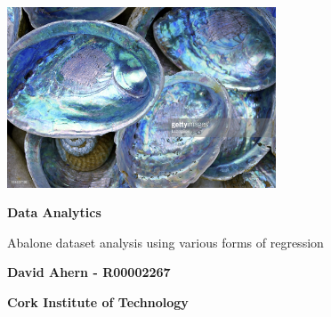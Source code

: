 \begin{titlepage}
    \begin{center}
    	\includegraphics[width=0.6\textwidth]{images/abalone.jpg}
    	
        \vspace*{1cm}
        
        \textbf{Data Analytics}
        
        \vspace{0.5cm}
      	Abalone dataset analysis using various forms of regression
        
        \vspace{1.5cm}
        
        \textbf{David Ahern - R00002267}
        
        \vspace{0.5cm}
        \textbf{Cork Institute of Technology}
        
    \end{center}
\end{titlepage}